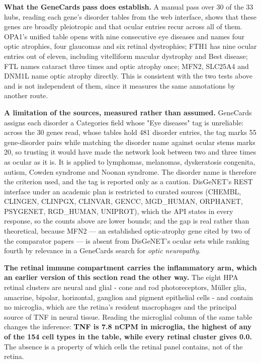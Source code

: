 \documentclass[utf8]{FrontiersinVancouver}
\begin{document}
\textbf{What the GeneCards pass does establish.} A manual pass over 30 of the 33 hubs, reading each gene's disorder tables from the web interface, shows that these genes are broadly pleiotropic and that ocular entries recur across all of them. OPA1's unified table opens with nine consecutive eye diseases and names four optic atrophies, four glaucomas and six retinal dystrophies; FTH1 has nine ocular entries out of eleven, including vitelliform macular dystrophy and Best disease; FTL names cataract three times and optic atrophy once; MFN2, SLC25A4 and DNM1L name optic atrophy directly. This is consistent with the two tests above and is not independent of them, since it measures the same annotations by another route.

\textbf{A limitation of the sources, measured rather than assumed.} GeneCards assigns each disorder a Categories field whose "Eye diseases" tag is unreliable: across the 30 genes read, whose tables hold 481 disorder entries, the tag marks 55 gene-disorder pairs while matching the disorder name against ocular stems marks 20, so trusting it would have made the network look between two and three times as ocular as it is. It is applied to lymphomas, melanomas, dyskeratosis congenita, autism, Cowden syndrome and Noonan syndrome. The disorder name is therefore the criterion used, and the tag is reported only as a caution. DisGeNET's REST interface under an academic plan is restricted to curated sources (CHEMBL, CLINGEN, CLINPGX, CLINVAR, GENCC, MGD\_HUMAN, ORPHANET, PSYGENET, RGD\_HUMAN, UNIPROT), which the API states in every response, so the counts above are lower bounds; and the gap is real rather than theoretical, because MFN2 --- an established optic-atrophy gene cited by two of the comparator papers --- is absent from DisGeNET's ocular sets while ranking fourth by relevance in a GeneCards search for \textit{optic neuropathy}.

\textbf{The retinal immune compartment carries the inflammatory arm, which an earlier version of this section read the other way.} The eight HPA retinal clusters are neural and glial - cone and rod photoreceptors, Müller glia, amacrine, bipolar, horizontal, ganglion and pigment epithelial cells - and contain no microglia, which are the retina's resident macrophages and the principal source of TNF in neural tissue. Reading the microglial column of the same table changes the inference: \textbf{TNF is 7.8 nCPM in microglia, the highest of any of the 154 cell types in the table, while every retinal cluster gives 0.0.} The absence is a property of which cells the retinal panel contains, not of the retina.
\end{document}
